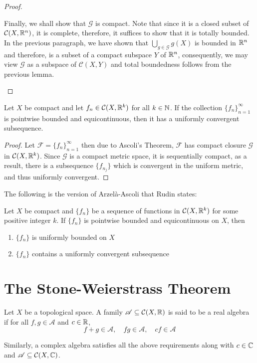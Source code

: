 \begin{proof}
\begin{description}
Finally, we shall show that $\mathcal G$ is compact. Note that since it is a closed subset of $\mathcal C(X,\mathbb{R}^n)$, it is complete, therefore, it suffices to show that it is totally bounded. In the previous paragraph, we have shown that $\bigcup\limits_{g\in\mathcal G}g(X)$ is bounded in $\mathbb{R}^n$ and therefore, is a subset of a compact subspace $Y$ of $\mathbb{R}^n$, consequently, we may view $\mathcal G$ as a subspace of $\mathcal C(X,Y)$ and total boundedness follows from the previous lemma.
\end{description}
\end{proof}

\begin{theorem}
    Let $X$ be compact and let $f_n\in\mathcal C(X,\mathbb{R}^k)$ for all $k\in\mathbb{N}$. If the collection $\{f_n\}_{n = 1}^\infty$ is pointwise bounded and equicontinuous, then it has a uniformly convergent subsequence.
\end{theorem}
\begin{proof}
    Let $\mathcal F = \{f_n\}_{n = 1}^\infty$ then due to Ascoli's Theorem, $\mathcal F$ has compact closure $\mathcal G$ in $\mathcal C(X,\mathbb{R}^k)$. Since $\mathcal G$ is a compact metric space, it is sequentially compact, as a result, there is a subsequence $\{f_{n_j}\}$ which is convergent in the uniform metric, and thus uniformly convergent.
\end{proof}

The following is the version of Arzel\`a-Ascoli that Rudin states:

\begin{corollary}
    Let $X$ be compact and $\{f_n\}$ be a sequence of functions in $\mathcal C(X,\mathbb{R}^k)$ for some positive integer $k$. If $\{f_n\}$ is pointwise bounded and equicontinuous on $X$, then 
    \begin{enumerate}[label=(\alph*)]
    \item $\{f_n\}$ is uniformly bounded on $X$ 
    \item $\{f_n\}$ contains a uniformly convergent subsequence
    \end{enumerate}
\end{corollary}

\section{The Stone-Weierstrass Theorem}

\begin{definition}[Algebra]
    Let $X$ be a topological space. A family $\mathscr A\subseteq\mathcal C(X,\mathbb{R})$ is said to be a real algebra if for all $f,g\in\mathscr A$ and $c\in\mathbb{R}$, 
    \begin{equation*}
        f + g\in\mathscr A,\quad fg\in\mathscr A,\quad cf\in\mathscr A
    \end{equation*}

    Similarly, a complex algebra satisfies all the above requirements along with $c\in\mathbb{C}$ and $\mathscr A\subseteq\mathcal C(X,\mathbb{C})$.
\end{definition}

